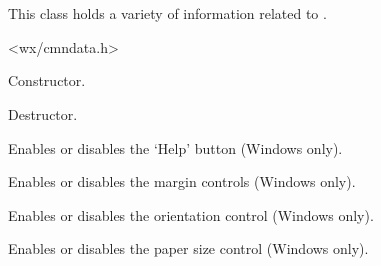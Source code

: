 \section{}\label{wxpagesetupdata}

This class holds a variety of information related to .




<wx/cmndata.h>






Constructor.



Destructor.

\label{wxpagesetupdataenablehelp}


Enables or disables the `Help' button (Windows only).

\label{wxpagesetupdataenablemargins}


Enables or disables the margin controls (Windows only).

\label{wxpagesetupdataenableorientation}


Enables or disables the orientation control (Windows only).

\label{wxpagesetupdataenablepaper}


Enables or disables the paper size control (Windows only).

\label{wxpagesetupdataenableprinter}

